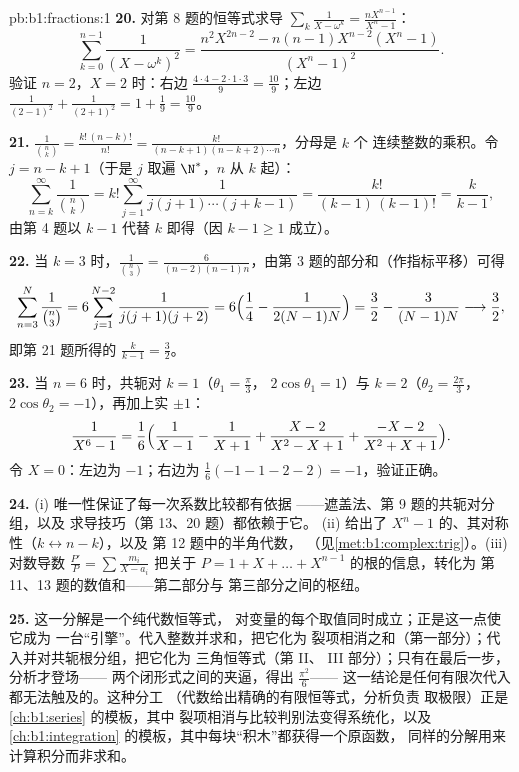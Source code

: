 \begin{solution}{pb:b1:fractions:1}
\textbf{20.} 对第 8 题的恒等式求导
$\sum_k\frac1{X-\omega^k} = \frac{nX^{n-1}}{X^n-1}$：
\[
\sum_{k=0}^{n-1}\frac1{(X - \omega^k)^2}
= \frac{n^2X^{2n-2} - n(n-1)X^{n-2}(X^n - 1)}{(X^n - 1)^2} .
\]
验证 $n = 2$，$X = 2$ 时：右边 $\frac{4\cdot4 -
2\cdot1\cdot3}{9} = \frac{10}9$；左边 $\frac1{(2-1)^2} +
\frac1{(2+1)^2} = 1 + \frac19 = \frac{10}9$。

\textbf{21.} $\frac1{\binom nk} = \frac{k!\,(n-k)!}{n!} =
\frac{k!}{(n-k+1)(n-k+2)\cdots n}$，分母是 $k$ 个
连续整数的乘积。令 $j = n - k + 1$（于是 $j$ 取遍
$\N^*$，$n$ 从 $k$ 起）：
\[
\sum_{n=k}^{\infty}\frac1{\binom nk}
= k!\sum_{j=1}^{\infty}\frac1{j(j+1)\cdots(j+k-1)}
= \frac{k!}{(k-1)\,(k-1)!} = \frac{k}{k-1} ,
\]
由第 4 题以 $k - 1$ 代替 $k$ 即得（因
$k - 1 \geq 1$ 成立）。

\textbf{22.} 当 $k = 3$ 时，$\frac1{\binom n3} =
\frac6{(n-2)(n-1)n}$，由第 3 题的部分和（作指标平移）可得
\[
\sum_{n=3}^{N}\frac1{\binom n3}
= 6\sum_{j=1}^{N-2}\frac1{j(j+1)(j+2)}
= 6\Bigl(\frac14 - \frac1{2(N-1)N}\Bigr)
= \frac32 - \frac3{(N-1)N}
\longrightarrow \frac32 ,
\]
即第 21 题所得的 $\frac k{k-1} = \frac32$。

\textbf{23.} 当 $n = 6$ 时，共轭对 $k = 1$（$\theta_1 = \frac\pi3$，
$2\cos\theta_1 = 1$）与 $k = 2$（$\theta_2 = \frac{2\pi}3$，
$2\cos\theta_2 = -1$），再加上实 $\pm1$：
\[
\frac1{X^6-1} = \frac16\Bigl(\frac1{X-1} - \frac1{X+1}
+ \frac{X - 2}{X^2 - X + 1}
+ \frac{-X - 2}{X^2 + X + 1}\Bigr) .
\]
令 $X = 0$：左边为 $-1$；右边为 $\frac16(-1 - 1 - 2 - 2)
= -1$，验证正确。

\textbf{24.} (i) 唯一性保证了每一次系数比较都有依据
——遮盖法、第 9 题的共轭对分组，以及
求导技巧（第 13、20 题）都依赖于它。
(ii) 给出了 $X^n -
1$ 的、其对称性（$k \leftrightarrow n-k$），以及
第 12 题中的半角代数，
（见\cref{met:b1:complex:trig}）。(iii) 对数导数
$\frac{P'}P = \sum\frac{m_i}{X-a_i}$ 把关于
$P = 1 + X + \dots + X^{n-1}$ 的根的信息，转化为
第 11、13 题的数值和——第二部分与
第三部分之间的枢纽。

\textbf{25.} 这一分解是一个纯代数恒等式，
对变量的每个取值同时成立；正是这一点使它成为
一台“引擎”。代入整数并求和，把它化为
裂项相消之和（第一部分）；代入并对共轭根分组，把它化为
三角恒等式（第 II、
III 部分）；只有在最后一步，分析才登场——
两个闭形式之间的夹逼，得出 $\frac{\pi^2}6$——
这一结论是任何有限次代入都无法触及的。这种分工
（代数给出精确的有限恒等式，分析负责
取极限）正是 \cref{ch:b1:series} 的模板，其中
裂项相消与比较判别法变得系统化，以及
\cref{ch:b1:integration} 的模板，其中每块“积木”都获得一个原函数，
同样的分解用来计算积分而非求和。
\end{solution}
